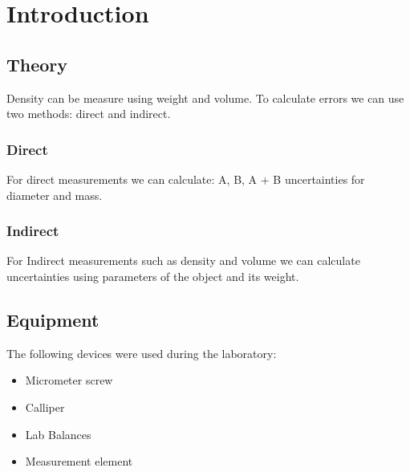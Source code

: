 \section{Introduction}

\subsection{Theory}
 
Density can be measure using weight and volume. To calculate errors we can use two methods: direct and indirect.
\subsubsection*{Direct}

For direct measurements we can calculate: A, B, A + B uncertainties for diameter and mass. 


\subsubsection*{Indirect}


For Indirect measurements such as density and volume we can calculate uncertainties using parameters of the object and its weight. 



\subsection{Equipment}

The following devices were used during the laboratory:

\begin{itemize}
	\item Micrometer screw
	\item Calliper
	\item Lab Balances
	\item Measurement element
\end{itemize}
